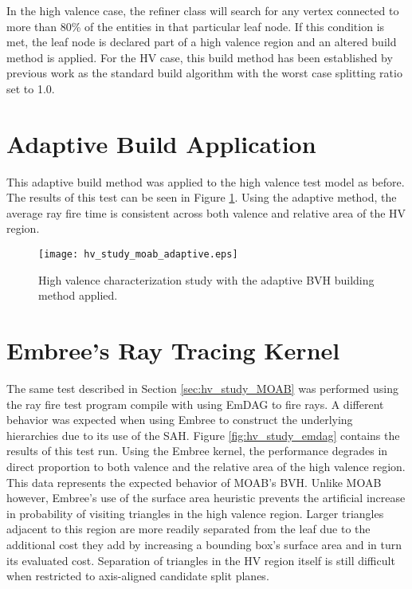 In the high valence case, the refiner class will search for any vertex connected
to more than 80\% of the entities in that particular leaf node. If this condition
is met, the leaf node is declared part of a high valence region and an altered
build method is applied. For the HV case, this build method has been established
by previous work as the standard build algorithm with the worst case splitting
ratio set to 1.0.

\section{Adaptive Build Application}

This adaptive build method was applied to the high valence test model as
before. The results of this test can be seen in Figure
\ref{fig:hv_study_adaptive}. Using the adaptive method, the average ray fire
time is consistent across both valence and relative area of the HV region.

\begin{figure}
  \centering
  \texttt{[image: hv\_study\_moab\_adaptive.eps]}
  \caption{High valence characterization study with the adaptive BVH building method
    applied.}
  \label{fig:hv_study_adaptive}
\end{figure}

\section{Embree's Ray Tracing Kernel}\label{sec:emdag_hv_study}

The same test described in Section \ref{sec:hv_study_MOAB} was performed
using the ray fire test program compile with using EmDAG to fire rays. A
different behavior was expected when using Embree to construct the underlying
hierarchies due to its use of the SAH. Figure \ref{fig:hv_study_emdag} contains
the results of this test run. Using the Embree kernel, the performance degrades
in direct proportion to both valence and the relative area of the high valence
region. This data represents the expected behavior of MOAB's BVH. Unlike MOAB
however, Embree's use of the surface area heuristic prevents the artificial
increase in probability of visiting triangles in the high valence region. Larger
triangles adjacent to this region are more readily separated from the leaf due
to the additional cost they add by increasing a bounding box's surface area and
in turn its evaluated cost. Separation of triangles in the HV region itself is
still difficult when restricted to axis-aligned candidate split planes.

